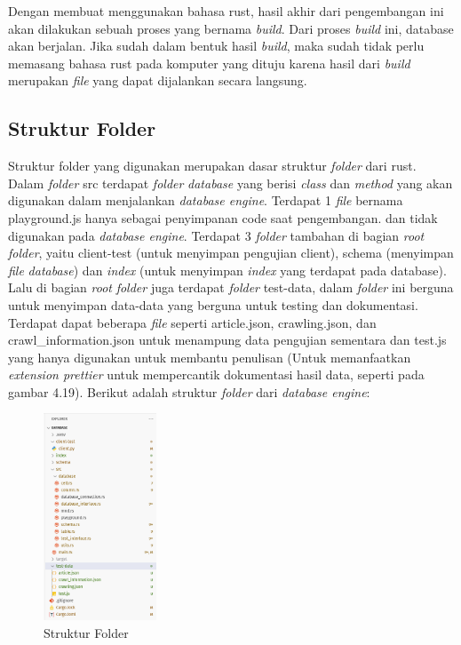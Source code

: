 Dengan membuat menggunakan bahasa rust, hasil akhir dari pengembangan ini akan dilakukan sebuah proses yang bernama \emph{build}. Dari proses \emph{build} ini,
database akan berjalan. Jika sudah dalam bentuk hasil \emph{build}, maka sudah tidak perlu memasang bahasa rust pada komputer yang dituju karena hasil dari \emph{build}
merupakan \emph{file} yang dapat dijalankan secara langsung.

\subsection{Struktur Folder}
Struktur folder yang digunakan merupakan dasar struktur \emph{folder} dari rust. Dalam \emph{folder} src terdapat \emph{folder} \emph{database} yang berisi \emph{class} dan \emph{method}
yang akan digunakan dalam menjalankan \emph{database engine}. Terdapat 1 \emph{file} bernama playground.js hanya sebagai penyimpanan code saat pengembangan. 
dan tidak digunakan pada \emph{database engine}. Terdapat 3 \emph{folder} tambahan di bagian \emph{root} \emph{folder}, yaitu client-test (untuk menyimpan pengujian client),
schema (menyimpan \emph{file} \emph{database}) dan \emph{index} (untuk menyimpan \emph{index} yang terdapat pada database). Lalu di bagian \emph{root} \emph{folder} juga terdapat \emph{folder} test-data, dalam \emph{folder} ini
berguna untuk menyimpan data-data yang berguna untuk testing dan dokumentasi. Terdapat dapat beberapa \emph{file} seperti article.json, crawling.json, dan crawl\_information.json 
untuk menampung data pengujian sementara dan test.js yang hanya digunakan untuk membantu penulisan (Untuk memanfaatkan \emph{extension prettier} untuk
mempercantik dokumentasi hasil data, seperti pada gambar 4.19). Berikut adalah struktur \emph{folder} dari \emph{database engine}:

\begin{figure}[H]
  \centering{}
	\includegraphics[width=0.3\textwidth]{gambar/bab4/struktur-folder.png}
  \caption{Struktur Folder}
\end{figure}


